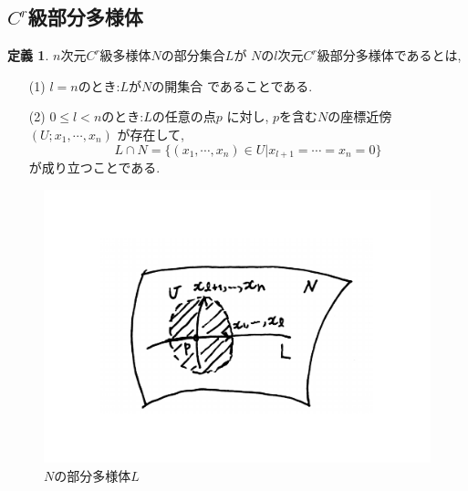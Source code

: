 \documentclass[a4j,12pt]{jarticle}
\theoremstyle{definition}
\newtheorem{definition}[theorem]{定義}
\begin{document}
\subsection{$C^r$級部分多様体}
\begin{definition}\label{def:C^r-submanifold}
    $n$次元$C^r$級多様体$N$の部分集合$L$が
    $N$の$l$次元$C^r$級部分多様体であるとは, 
    \begin{itemize}
        \item[(1)]$l=n$のとき:$L$が$N$の開集合
        であることである. 
        \item[(2)] $0\leq l<n$のとき:$L$の任意の点$p$
        に対し, $p$を含む$N$の座標近傍$(U;x_1,\cdots ,x_n)$
        が存在して, 
        $$L\cap N=\{(x_1,\cdots ,x_n)\in U|
        x_{l+1}=\cdots =x_n=0\}$$
        が成り立つことである. 
    \end{itemize}
\end{definition}
\begin{figure}[H]
    \centering
    \includegraphics[keepaspectratio, scale=0.4]{CrSubmanifold.pdf}
    \caption{$N$の部分多様体$L$}
    \label{CrSubmanifold}
   \end{figure}
   
\end{document}
